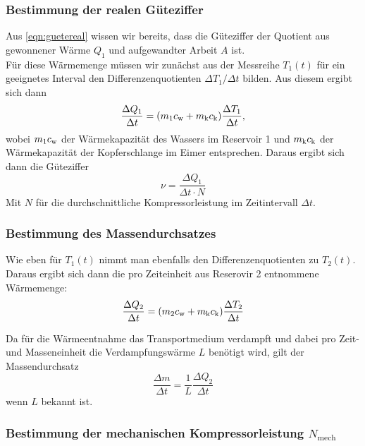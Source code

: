 \subsubsection{Bestimmung der realen Güteziffer}

Aus \ref{eqn:guetereal} wissen wir bereits, dass die Güteziffer der Quotient aus gewonnener Wärme 
$Q_1$ und aufgewandter Arbeit $A$ ist. \\
Für diese Wärmemenge müssen wir zunächst aus der Messreihe $T_1(t)$ für ein geeignetes Interval 
den Differenzenquotienten $\Delta T_1 / \Delta t$ bilden. Aus diesem ergibt sich dann
\begin{equation}
	\frac{\Delta Q_1}{\Delta t}
	= (m_1 c_\text w + m_\text k c_\text k) \frac{\Delta T_1}{\Delta t},
	\label{eqn:bestgueteziffer1}
\end{equation}
wobei $m_1c_\text w$ der Wärmekapazität des Wassers im Reservoir 1 und $m_\text k c_\text k$ der
Wärmekapazität der Kopferschlange im Eimer entsprechen. Daraus ergibt sich dann die 
Güteziffer
\begin{equation}
	\nu = \frac{\Delta Q_1}{\Delta t \cdot N}
	\label{eqn:messgueteziffer}
\end{equation}
Mit $N$ für die durchschnittliche Kompressorleistung im Zeitintervall $\Delta t$.

\subsubsection{Bestimmung des Massendurchsatzes}

Wie eben für $T_1(t)$ nimmt man ebenfalls den Differenzenquotienten zu $T_2(t)$. Daraus 
ergibt sich dann die pro Zeiteinheit aus Reserovir 2 entnommene Wärmemenge:
\begin{equation}
	\frac{\Delta Q_2}{\Delta t}
	= (m_2 c_\text w + m_\text k c_\text k)  \frac{\Delta T_2}{\Delta t}
	\label{eqn:waermeleitung2}
\end{equation}

Da für die Wärmeentnahme das Transportmedium verdampft und dabei pro Zeit- und Masseneinheit die 
Verdampfungswärme $L$ benötigt wird, gilt der Massendurchsatz
\begin{equation}
	\frac{\Delta m}{\Delta t}
	=
	\frac{1}{L} \frac{\Delta Q_2}{\Delta t}
	\label{eqn:massendurchsatz}
\end{equation}
wenn $L$ bekannt ist.

\subsubsection{Bestimmung der mechanischen Kompressorleistung 
$N_\text{mech}$}

